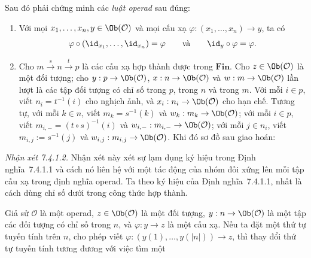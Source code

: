 Sau đó phải chứng minh các \emph{luật operad} sau đúng:
\begin{enumerate}[label=\arabic*.]
\item Với mọi $x_1,\ldots,x_n,y\in\Ob(\mathcal O)$ và mọi cấu xạ $\varphi:(x_1,\ldots,x_n)\to y$, ta có
\[
\varphi\circ(\id_{x_1},\ldots,\id_{x_n})=\varphi\qquad\text{và}\qquad\id_y\circ\varphi=\varphi.
\]
\item Cho $m\xrightarrow{s}n\xrightarrow{t}p$ là các cấu xạ hợp thành được trong $\mathbf{Fin}$. Cho $z\in\Ob(\mathcal O)$ là một đối tượng; cho $y:p\to\Ob(\mathcal O)$, $x:n\to\Ob(\mathcal O)$ và $w:m\to\Ob(\mathcal O)$ lần lượt là các tập đối tượng có chỉ số trong $p$, trong $n$ và trong $m$. Với mỗi $i\in p$, viết $n_i=t^{-1}(i)$ cho nghịch ảnh, và $x_i:n_i\to\Ob(\mathcal O)$ cho hạn chế. Tương tự, với mỗi $k\in n$, viết $m_k=s^{-1}(k)$ và $w_k:m_k\to\Ob(\mathcal O)$; với mỗi $i\in p$, viết $m_{i,-}=(t\circ s)^{-1}(i)$ và $w_{i,-}:m_{i,-}\to\Ob(\mathcal O)$; với mỗi $j\in n_i$, viết $m_{i,j}:=s^{-1}(j)$ và $w_{i,j}:m_{i,j}\to\Ob(\mathcal O)$. Khi đó sơ đồ sau giao hoán:
\begin{center}
\end{center}
\end{enumerate}

\noindent\textit{Nhận xét 7.4.1.2.}\keepwithnext
Nhận xét này xét sự lạm dụng ký hiệu trong Định nghĩa~7.4.1.1 và cách nó liên hệ với một tác động của nhóm đối xứng lên mỗi tập cấu xạ trong định nghĩa operad. Ta theo ký hiệu của Định nghĩa~7.4.1.1, nhất là cách dùng chỉ số dưới trong công thức hợp thành.

Giả sử $\mathcal O$ là một operad, $z\in\Ob(\mathcal O)$ là một đối tượng, $y:n\to\Ob(\mathcal O)$ là một tập các đối tượng có chỉ số trong $n$, và $\varphi:y\to z$ là một cấu xạ. Nếu ta đặt một thứ tự tuyến tính trên $n$, cho phép viết $\varphi:(y(1),\ldots,y(|n|))\to z$, thì thay đổi thứ tự tuyến tính tương đương với việc tìm một
